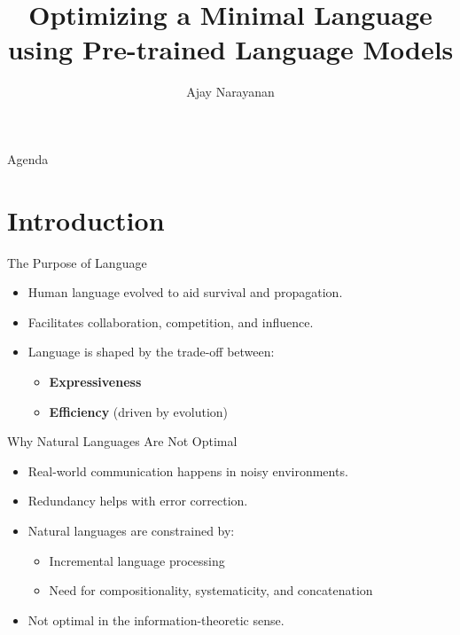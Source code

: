\documentclass{beamer}
\title{Optimizing a Minimal Language using Pre-trained Language Models}
\date{}
\author{Ajay Narayanan}
\institute{Technical University of Munich}
\begin{document}
  \maketitle

\begin{frame}{Agenda}
	\tableofcontents
\end{frame}

\section{Introduction}

\begin{frame}{The Purpose of Language}
	\begin{itemize}
		\item Human language evolved to aid survival and propagation.
		\item Facilitates collaboration, competition, and influence.
		\item Language is shaped by the trade-off between:
		\begin{itemize}
			\item \textbf{Expressiveness}
			\item \textbf{Efficiency} (driven by evolution)
		\end{itemize}
	\end{itemize}
\end{frame}

\begin{frame}{Why Natural Languages Are Not Optimal}
	\begin{itemize}
		\item Real-world communication happens in noisy environments.
		\item Redundancy helps with error correction.
		\item Natural languages are constrained by:
		\begin{itemize}
			\item Incremental language processing
			\item Need for compositionality, systematicity, and concatenation
		\end{itemize}
		\item Not optimal in the information-theoretic sense.
	\end{itemize}
\end{frame}
\end{document}
